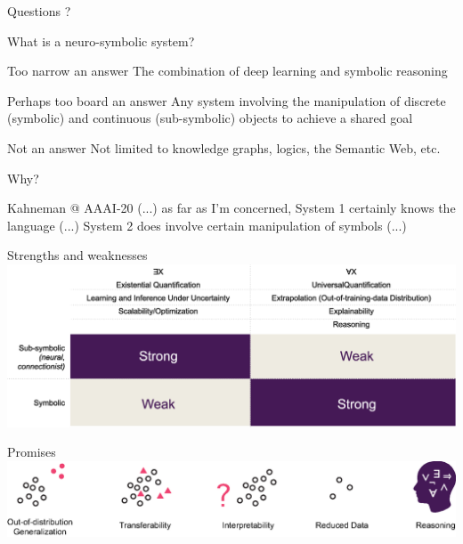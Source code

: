 \documentclass{lecture}
\begin{document}
\begin{frame}{Questions}
    \centering \Huge \alert{?}
\end{frame}

\begin{frame}{What is a neuro-symbolic system?}
    \begin{block}{Too narrow an answer}
        The combination of deep learning and symbolic reasoning
    \end{block}
    \pause
    \begin{block}{Perhaps too board an answer}
        Any system involving the manipulation of discrete (symbolic) and continuous (sub-symbolic) objects to achieve a shared goal
    \end{block}
    \pause
    \begin{block}{Not an answer}
        Not limited to knowledge graphs, logics, the Semantic Web, etc.
    \end{block}
\end{frame}

\begin{frame}{Why?}
    \begin{block}{Kahneman @ AAAI-20}
        (...) as far as I’m concerned, System 1 certainly knows the language (...)
System 2 does involve certain manipulation of symbols (...)
    \end{block}
\end{frame}

\begin{frame}{Strengths and weaknesses}
    \includegraphics[width=\textwidth]{SW223228/nesy-table-diagram.eps}
\end{frame}

\begin{frame}{Promises}
    \includegraphics[width=\textwidth]{SW223228/promises.eps}
\end{frame}
\end{document}
